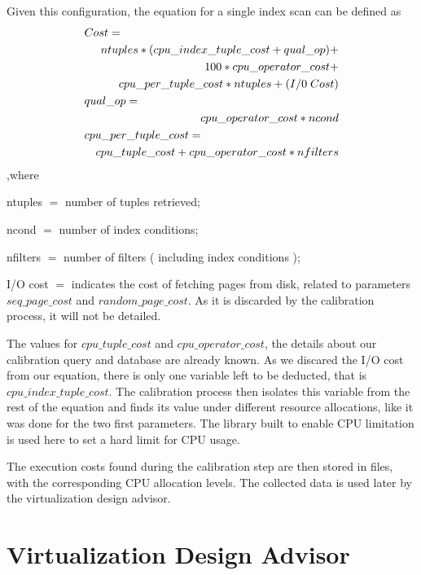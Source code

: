 Given this configuration, the equation for a single index scan can be defined as
\begin{eqnarray*}
  \lefteqn{Cost=} \\
  &&ntuples * ( cpu\_index\_tuple\_cost + qual\_op ) + \\
  &&100*cpu\_operator\_cost + \\
  &&cpu\_per\_tuple\_cost * ntuples + ( I/0\;Cost ) \\
  \lefteqn{qual\_op=} \\
  &&cpu\_operator\_cost * ncond \\
  \lefteqn{cpu\_per\_tuple\_cost=} \\
  &&cpu\_tuple\_cost + cpu\_operator\_cost * nfilters
\end{eqnarray*}
,where
\begin{description}
 \item ntuples $=$ number of tuples retrieved;
 \item ncond $=$ number of index conditions;
 \item nfilters $=$ number of filters ( including index conditions );
 \item I/O cost $=$ indicates the cost of fetching pages from disk, related to parameters $seq\_page\_cost$ and $random\_page\_cost$. As it is discarded by the calibration process, it will not be detailed.
\end{description}

The values for $cpu\_tuple\_cost$ and $cpu\_operator\_cost$, the details about our calibration query and database are already known. As we discared the I/O cost from our equation, there is only one variable left to be deducted, that is $cpu\_index\_tuple\_cost$. The calibration process then isolates this variable from the rest of the equation and finds its value under different resource allocations, like it was done for the two first parameters. The library built to enable CPU limitation is used here to set a hard limit for CPU usage.

The execution costs found during the calibration step are then stored in files, with the corresponding CPU allocation levels. The collected data is used later by the virtualization design advisor. 

\section{Virtualization Design Advisor}

